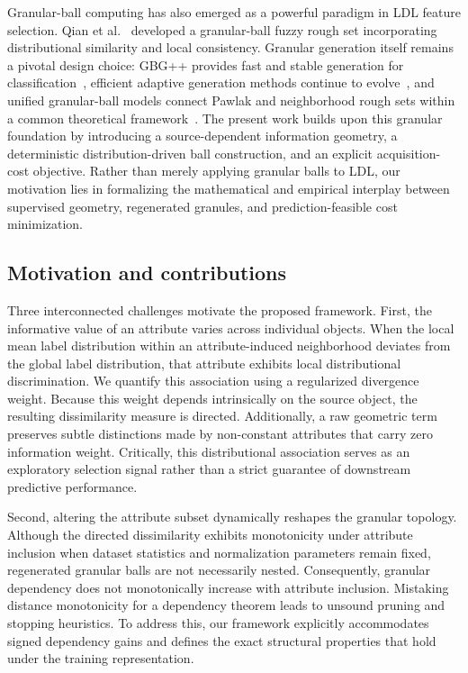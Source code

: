 Granular-ball computing has also emerged as a powerful paradigm in LDL feature selection. Qian et al.~\cite{Qian2023GBLDL} developed a granular-ball fuzzy rough set incorporating distributional similarity and local consistency. Granular generation itself remains a pivotal design choice: GBG++ provides fast and stable generation for classification~\cite{Xie2024GBG}, efficient adaptive generation methods continue to evolve~\cite{Xia2023GBadaptive}, and unified granular-ball models connect Pawlak and neighborhood rough sets within a common theoretical framework~\cite{Xia2023GBRS}. The present work builds upon this granular foundation by introducing a source-dependent information geometry, a deterministic distribution-driven ball construction, and an explicit acquisition-cost objective. Rather than merely applying granular balls to LDL, our motivation lies in formalizing the mathematical and empirical interplay between supervised geometry, regenerated granules, and prediction-feasible cost minimization.

\subsection{Motivation and contributions}
Three interconnected challenges motivate the proposed framework. First, the informative value of an attribute varies across individual objects. When the local mean label distribution within an attribute-induced neighborhood deviates from the global label distribution, that attribute exhibits local distributional discrimination. We quantify this association using a regularized divergence weight. Because this weight depends intrinsically on the source object, the resulting dissimilarity measure is directed. Additionally, a raw geometric term preserves subtle distinctions made by non-constant attributes that carry zero information weight. Critically, this distributional association serves as an exploratory selection signal rather than a strict guarantee of downstream predictive performance.

Second, altering the attribute subset dynamically reshapes the granular topology. Although the directed dissimilarity exhibits monotonicity under attribute inclusion when dataset statistics and normalization parameters remain fixed, regenerated granular balls are not necessarily nested. Consequently, granular dependency does not monotonically increase with attribute inclusion. Mistaking distance monotonicity for a dependency theorem leads to unsound pruning and stopping heuristics. To address this, our framework explicitly accommodates signed dependency gains and defines the exact structural properties that hold under the training representation.

